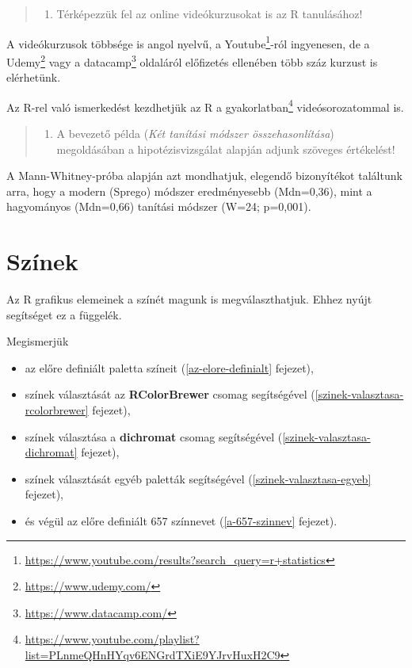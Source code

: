 \documentclass[
]{book}
\DeclareRobustCommand{\href}[2]{#2\footnote{\url{#1}}}
\providecommand{\tightlist}{%
  \setlength{\itemsep}{0pt}\setlength{\parskip}{0pt}}
\begin{document}
\begin{quote}
\begin{enumerate}
\def\labelenumi{\arabic{enumi}.}
\setcounter{enumi}{1}
\tightlist
\item
  Térképezzük fel az online videókurzusokat is az R tanulásához!
\end{enumerate}
\end{quote}

A videókurzusok többsége is angol nyelvű, a \href{https://www.youtube.com/results?search_query=r+statistics}{Youtube}-ról ingyenesen, de a \href{https://www.udemy.com/}{Udemy} vagy a \href{https://www.datacamp.com/}{datacamp} oldaláról előfizetés ellenében több száz kurzust is elérhetünk.

Az R-rel való ismerkedést kezdhetjük az \href{https://www.youtube.com/playlist?list=PLnmeQHnHYqv6ENGrdTXiE9YJrvHuxH2C9}{R a gyakorlatban} videósorozatommal is.

\begin{quote}
\begin{enumerate}
\def\labelenumi{\arabic{enumi}.}
\setcounter{enumi}{2}
\tightlist
\item
  A bevezető példa (\emph{Két tanítási módszer összehasonlítása}) megoldásában a hipotézisvizsgálat alapján adjunk szöveges értékelést!
\end{enumerate}
\end{quote}

A Mann-Whitney-próba alapján azt mondhatjuk, elegendő bizonyítékot találtunk arra, hogy a modern (Sprego) módszer eredményesebb (Mdn=0,36), mint a hagyományos (Mdn=0,66) tanítási módszer (W=24; p=0,001).

\hypertarget{szinek}{%
\chapter{Színek}\label{szinek}}

Az R grafikus elemeinek a színét magunk is megválaszthatjuk. Ehhez nyújt segítséget ez a függelék.

Megismerjük

\begin{itemize}
\tightlist
\item
  az előre definiált paletta színeit (\ref{az-elore-definialt} fejezet),
\item
  színek választását az \textbf{RColorBrewer} csomag segítségével (\ref{szinek-valasztasa-rcolorbrewer} fejezet),
\item
  színek választása a \textbf{dichromat} csomag segítségével (\ref{szinek-valasztasa-dichromat} fejezet),
\item
  színek választását egyéb paletták segítségével (\ref{szinek-valasztasa-egyeb} fejezet),
\item
  és végül az előre definiált 657 színnevet (\ref{a-657-szinnev} fejezet).
\end{itemize}
\end{document}
